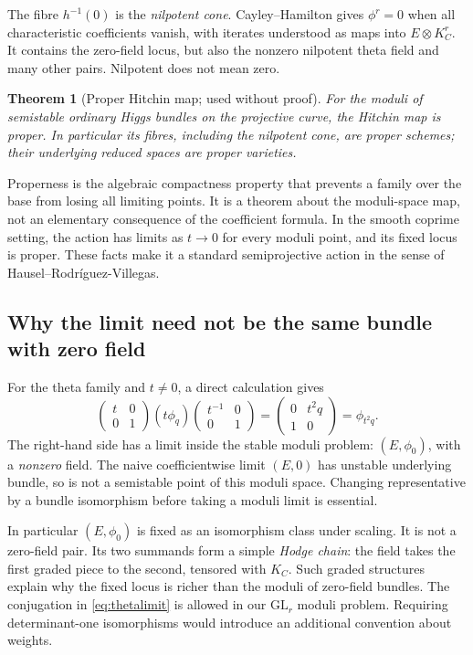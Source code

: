 \documentclass[11pt,a4paper]{article}
\numberwithin{equation}{section}
\newtheorem{theorem}[definition]{Theorem}
\theoremstyle{definition}
\begin{document}
The fibre $h^{-1}(0)$ is the \emph{nilpotent cone}. Cayley--Hamilton
gives $\phi^r=0$ when all characteristic coefficients vanish, with
iterates understood as maps into $E\otimes K_C^r$. It contains the
zero-field locus, but also the nonzero nilpotent theta field and many
other pairs. Nilpotent does not mean zero.

\begin{theorem}[Proper Hitchin map; used without proof]
For the moduli of semistable ordinary Higgs bundles on the projective
curve, the Hitchin map is proper. In particular its fibres, including
the nilpotent cone, are proper schemes; their underlying reduced spaces
are proper varieties.
\end{theorem}

Properness is the algebraic compactness property that prevents a family
over the base from losing all limiting points. It is a theorem about
the moduli-space map, not an elementary consequence of the coefficient
formula. In the smooth coprime setting, the action has limits as
$t\to0$ for every moduli point, and its fixed locus is proper.
These facts make it a standard semiprojective action in the sense
of Hausel--Rodríguez-Villegas.

\subsection{Why the limit need not be the same bundle with zero field}
For the theta family and $t\ne0$, a direct calculation gives
\begin{equation}\label{eq:thetalimit}
 \begin{pmatrix}t&0\\0&1\end{pmatrix}
 (t\phi_q)
 \begin{pmatrix}t^{-1}&0\\0&1\end{pmatrix}
 =\begin{pmatrix}0&t^2q\\1&0\end{pmatrix}=\phi_{t^2q}.
\end{equation}
The right-hand side has a limit inside the stable moduli problem:
$(E,\phi_0)$, with a \emph{nonzero} field. The naive coefficientwise
limit $(E,0)$ has unstable underlying bundle, so is not a semistable
point of this moduli space. Changing representative by a bundle
isomorphism before taking a moduli limit is essential.

In particular $(E,\phi_0)$ is fixed as an isomorphism class under scaling.
It is not a zero-field pair. Its two summands form a simple
\emph{Hodge chain}: the field takes the first graded piece to the
second, tensored with $K_C$. Such graded structures explain why the
fixed locus is richer than the moduli of zero-field bundles.
The conjugation in \eqref{eq:thetalimit} is allowed in our
$\mathrm{GL}_r$ moduli problem. Requiring determinant-one isomorphisms
would introduce an additional convention about weights.
\end{document}
